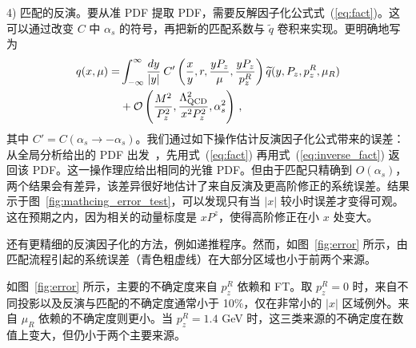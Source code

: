 4) 匹配的反演。要从准 PDF 提取 PDF，需要反解因子化公式式~(\ref{eq:fact})。这可以通过改变 $C$ 中 $\alpha_s$ 的符号，再把新的匹配系数与 $\widetilde{q}$ 卷积来实现。更明确地写为
\begin{align}\label{eq:inverse_fact}
q(x,\mu)=&\int_{-\infty}^\infty {dy\over |y|}\: C'\left({x\over y},r,\frac{yP_z}{\mu},\frac{yP_z}{p_z^R}\right)\widetilde{q}(y,P_z, p^R_z,\mu_R)\nonumber\\
&+\mathcal{O}\left({M^2\over P_z^2},{\Lambda_{\text{QCD}}^2\over x^2 P_z^2},\alpha_s^2\right)\,,
\end{align}
其中 $C'=C(\alpha_s\to-\alpha_s)$。我们通过如下操作估计反演因子化公式带来的误差：{从全局分析给出的 PDF 出发~\cite{Dulat:2015mca}，先用式~(\ref{eq:fact}) 再用式~(\ref{eq:inverse_fact}) 返回该 PDF。这一操作理应给出相同的光锥 PDF}。但由于匹配只精确到 $O(\alpha_s)$，两个结果会有差异，该差异很好地估计了来自反演及更高阶修正的系统误差。结果示于图~\ref{fig:mathcing_error_test}，可以发现只有当 $|x|$ 较小时误差才变得可观。{这在预期之内，因为相关的动量标度是 $xP^z$，使得高阶修正在小 $x$ 处变大}。

还有更精细的反演因子化的方法，例如递推程序。然而，如图~\ref{fig:error} 所示，由匹配流程引起的系统误差（青色粗虚线）在大部分区域也小于前两个来源。

如图~\ref{fig:error} 所示，主要的不确定度来自 $p_z^R$ 依赖和 FT。取 $p_z^R=0$ 时，来自不同投影以及反演与匹配的不确定度通常小于 10\%，仅在非常小的 $|x|$ 区域例外。来自 $\mu_R$ 依赖的不确定度则更小。当 $p_z^R=1.4$ GeV 时，这三类来源的不确定度在数值上变大，但仍小于两个主要来源。

